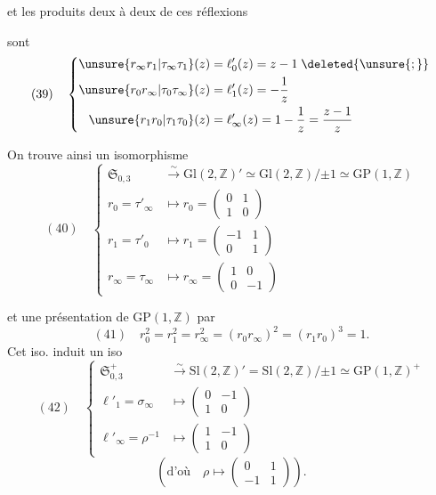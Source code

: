  et les produits deux à deux de ces réflexions


sont
\[
(39)\quad\left\{\begin{aligned}
\unsure{r_\infty r_1|\tau_\infty\tau_1}(z)&=\ell'_0(z)=z-1\;\deleted{\unsure{;}}\\\unsure{r_0r_\infty|\tau_0\tau_\infty}(z)&=\ell'_1(z)=-\frac1z\\
\unsure{r_1r_0|\tau_1\tau_0}(z)&=\ell'_\infty(z)=1-\frac1z=\frac{z-1}{z}
\end{aligned}\right.
\]

On trouve ainsi un isomorphisme
\[
(40)\quad\left\{\begin{aligned}
\mathfrak S_{0,3}&\xrightarrow{\sim}\mathrm{Gl}(2,\mathbb Z)'\simeq
\mathrm{Gl}(2,\mathbb Z)/\mathord{\pm}1\simeq\mathrm{GP}(1,\mathbb Z)\\
r_0=\tau'_\infty&\longmapsto r_0=\begin{pmatrix}0&1\\1&0\end{pmatrix}\\
r_1=\tau'_0&\longmapsto r_1=\begin{pmatrix}-1&1\\0&1\end{pmatrix}\\
r_\infty=\tau_\infty&\longmapsto r_\infty=\begin{pmatrix}1&0\\0&-1\end{pmatrix}
\end{aligned}\right.
\]

et une présentation de $\mathrm{GP}(1,\mathbb Z)$ par
\[
(41)\quad r_0^2=r_1^2=r_\infty^2=(r_0r_\infty)^2=(r_1r_0)^3=1.
\]
Cet iso. induit un iso
\[
(42)\quad\left\{\begin{aligned}
\mathfrak S_{0,3}^{+}&\xrightarrow{\sim}
\mathrm{Sl}(2,\mathbb Z)'=\mathrm{Sl}(2,\mathbb Z)/\mathord{\pm}1
\simeq\mathrm{GP}(1,\mathbb Z)^{+}\\
\ell'_1=\sigma_\infty&\longmapsto\begin{pmatrix}0&-1\\1&0\end{pmatrix}\\
\ell'_\infty=\rho^{-1}&\longmapsto\begin{pmatrix}1&-1\\1&0\end{pmatrix}
\end{aligned}\right.
\]
\[
(\text{d'où}\quad\rho\longmapsto\begin{pmatrix}0&1\\-1&1\end{pmatrix}).
\]

